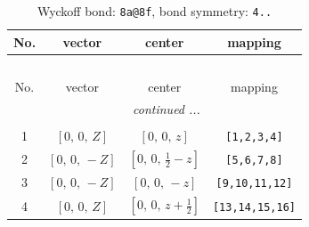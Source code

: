\documentclass[fleqn,8pt]{jsarticle}
\begin{document}
\begin{longtable}{cccc}
\caption{Wyckoff bond: {\tt 8a@8f}, bond symmetry: {\tt 4..}}
 \\
 \hline \hline
No. & vector & center & mapping \\ \hline \endfirsthead

\multicolumn{3}{l}{\tablename\ \thetable{}} \\
 \hline \hline
No. & vector & center & mapping \\ \hline \endhead

 \hline \hline
\multicolumn{3}{r}{\footnotesize\it continued ...} \\ \endfoot

 \hline \hline
\multicolumn{3}{r}{} \\ \endlastfoot

1 & $\left[ 0,\, 0,\, Z \right]$ & $\left[ 0,\, 0,\, z \right]$ & {\tt [1,2,3,4]} \\ \hline
2 & $\left[ 0,\, 0,\, - Z \right]$ & $\left[ 0,\, 0,\, \frac{1}{2} - z \right]$ & {\tt [5,6,7,8]} \\ \hline
3 & $\left[ 0,\, 0,\, - Z \right]$ & $\left[ 0,\, 0,\, - z \right]$ & {\tt [9,10,11,12]} \\ \hline
4 & $\left[ 0,\, 0,\, Z \right]$ & $\left[ 0,\, 0,\, z + \frac{1}{2} \right]$ & {\tt [13,14,15,16]} \\
\end{longtable}
\renewcommand{\arraystretch}{1.2}
\end{document}
